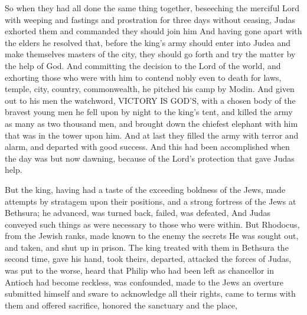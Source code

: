 {So when they had all done the same thing together,
 beseeching the merciful Lord with weeping and fastings and prostration for three days without ceasing, Judas exhorted them and commanded they should join him
{}
And having gone apart with the elders he resolved that, before the king’s army should enter into Judea and make themselves masters of the city, they should go forth and try the matter
{} by the help of
 God.
And committing the decision to the
 Lord of the world, and exhorting those who were with him to contend nobly even to death for laws, temple, city, country,
 commonwealth, he pitched his camp by Modin.
And given out to his men the watchword, VICTORY IS GOD’S, with a chosen body of the bravest young men he fell upon
{} by night
{} to the king’s
 tent, and killed
{} the
 army as many as two thousand men, and
 brought down the chiefest elephant with him that was in the
 tower upon him.
And at last they filled the
 army with terror and alarm, and departed with good success.
And this had been accomplished when the day was but now dawning, because of the Lord’s protection that gave
 Judas help.
\par }{\PP {}But the king, having had a taste of the exceeding boldness of the Jews, made attempts by stratagem upon their positions,
and
{} a strong fortress of the Jews at Bethsura; he advanced, was turned back, failed, was defeated,
And Judas conveyed such things as were necessary to those who were within.
But Rhodocus, from the Jewish ranks, made known to the enemy the secrets
{} He was sought out, and taken, and shut up in prison.
The king treated with them in Bethsura the second time, gave his hand, took theirs, departed, attacked the forces of Judas, was put to the worse,
heard that Philip who had been left as chancellor in Antioch had become reckless, was confounded, made to the Jews an overture
{} submitted himself and sware to acknowledge all their rights, came to terms with them and offered sacrifice, honored the sanctuary and the place,
}
